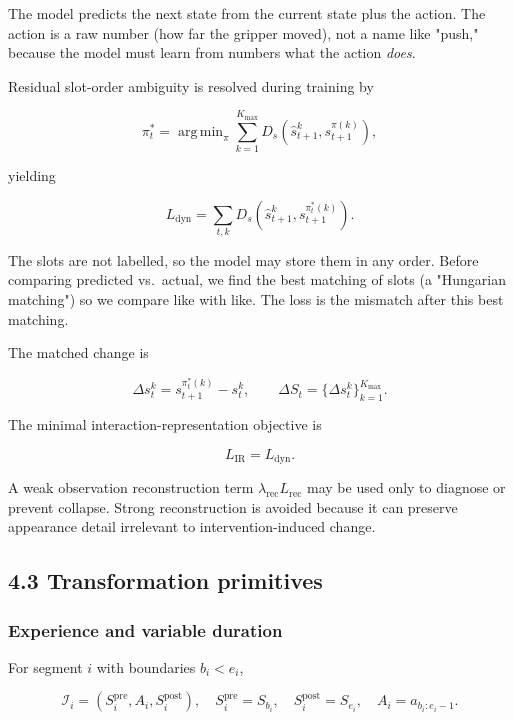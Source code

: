 \documentclass[11pt]{article}
\DeclareMathOperator*{\argmin}{arg\,min}
\newenvironment{plainword}{%
  \par\medskip\noindent\begin{minipage}{\textwidth}%
  \color{gray!75!black}\small\itshape
}{%
  \end{minipage}\par\medskip}
\begin{document}
\begin{plainword}
The model predicts the next state from the current state plus the action. The action is a raw number (how far the gripper moved),
not a name like "push," because the model must learn from numbers what the action \emph{does}.
\end{plainword}

Residual slot-order ambiguity is resolved during training by

\[
\pi_t^*=\argmin_{\pi}\sum_{k=1}^{K_{\max}}
D_s(\widehat s_{t+1}^k,s_{t+1}^{\pi(k)}),
\]

yielding

\[
\boxed{L_{\mathrm{dyn}}=\sum_{t,k}
D_s(\widehat s_{t+1}^k,s_{t+1}^{\pi_t^*(k)}).}
\]

\begin{plainword}
The slots are not labelled, so the model may store them in any order. Before comparing predicted vs.\ actual, we find the best
matching of slots (a "Hungarian matching") so we compare like with like. The loss is the mismatch after this best matching.
\end{plainword}

The matched change is

\[
\Delta s_t^k=s_{t+1}^{\pi_t^*(k)}-s_t^k,
\qquad
\Delta S_t=\{\Delta s_t^k\}_{k=1}^{K_{\max}}.
\]

The minimal interaction-representation objective is

\[
\boxed{L_{\mathrm{IR}}=L_{\mathrm{dyn}}.}
\]

A weak observation reconstruction term $\lambda_{\mathrm{rec}}L_{\mathrm{rec}}$ may be used only to diagnose or prevent collapse.
Strong reconstruction is avoided because it can preserve appearance detail irrelevant to intervention-induced change.

\subsection*{4.3 Transformation primitives}

\subsubsection*{Experience and variable duration}

For segment $i$ with boundaries $b_i<e_i$,

\[
\boxed{
\mathcal I_i=(S_i^{\mathrm{pre}},A_i,S_i^{\mathrm{post}}),\quad
S_i^{\mathrm{pre}}=S_{b_i},\quad
S_i^{\mathrm{post}}=S_{e_i},\quad
A_i=a_{b_i:e_i-1}.}
\]
\end{document}
